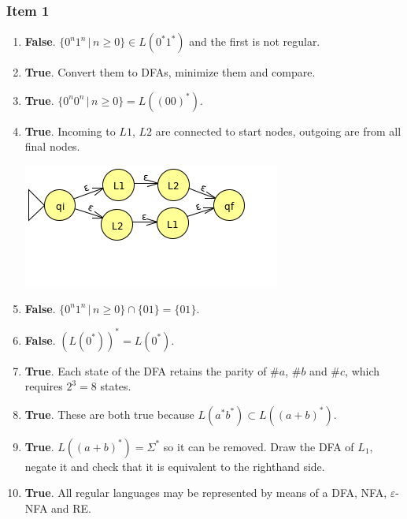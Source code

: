\subsubsection{Item 1}
\begin{enumerate}[label=(\alph*)]
	\item \textbf{False}. $\{0^n1^n\,|\,n \geq 0\} \in L(0^*1^*)$ and the first is not regular.
	\item \textbf{True}. Convert them to DFAs, minimize them and compare.
	\item \textbf{True}. $\{0^n0^n\,|\,n \geq 0\}=L((00)^*)$.
	\item \textbf{True}. Incoming to $L1$, $L2$ are connected to start nodes, outgoing are from all final nodes.
	\begin{center} \includegraphics[scale=0.5,trim={0 20mm 0 0},clip]{2012T1_8_1d} \end{center}
	\item \textbf{False}. $\{0^n1^n\,|\,n \geq 0\} \cap \{01\} = \{01\}$.
	\item \textbf{False}. $(L(0^*))^*=L(0^*)$.
	\item \textbf{True}. Each state of the DFA retains the parity of $\#a$, $\#b$ and $\#c$, which requires $2^3=8$ states.
	\item \textbf{True}. These are both true because $L(a^*b^*) \subset L((a+b)^*)$.
	\item \textbf{True}. $L((a+b)^*)=\Sigma^*$ so it can be removed. Draw the DFA of $L_1$, negate it and check that it is equivalent to the righthand side.
	\item \textbf{True}. All regular languages may be represented by means of a DFA, NFA, $\varepsilon$-NFA and RE.
\end{enumerate}

